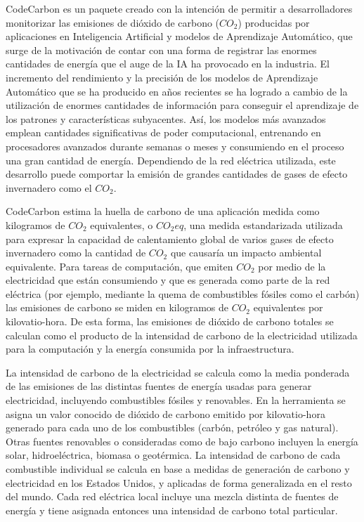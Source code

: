 CodeCarbon es un paquete creado con la intención de permitir a desarrolladores monitorizar las emisiones de dióxido de carbono ($CO_{2}$) producidas por aplicaciones en Inteligencia Artificial y modelos de Aprendizaje Automático, que surge de la motivación de contar con una forma de registrar las enormes cantidades de energía que el auge de la IA ha provocado en la industria. El incremento del rendimiento y la precisión de los modelos de Aprendizaje Automático que se ha producido en años recientes se ha logrado a cambio de la utilización de enormes cantidades de información para conseguir el aprendizaje de los patrones y características subyacentes. Así, los modelos más avanzados emplean cantidades significativas de poder computacional, entrenando en procesadores avanzados durante semanas o meses y consumiendo en el proceso una gran cantidad de energía. Dependiendo de la red eléctrica utilizada, este desarrollo puede comportar la emisión de grandes cantidades de gases de efecto invernadero como el $CO_{2}$.

CodeCarbon estima la huella de carbono de una aplicación medida como kilogramos de $CO_{2}$ equivalentes, o $CO_{2}eq$, una medida estandarizada utilizada para expresar la capacidad de calentamiento global de varios gases de efecto invernadero como la cantidad de $CO_{2}$ que causaría un impacto ambiental equivalente. Para tareas de computación, que emiten $CO_{2}$ por medio de la electricidad que están consumiendo y que es generada como parte de la red eléctrica (por ejemplo, mediante la quema de combustibles fósiles como el carbón) las emisiones de carbono se miden en kilogramos de $CO_{2}$ equivalentes por kilovatio-hora. De esta forma, las emisiones de dióxido de carbono totales se calculan como el producto de la intensidad de carbono de la electricidad utilizada para la computación y la energía consumida por la infraestructura.

La intensidad de carbono de la electricidad se calcula como la media ponderada de las emisiones de las distintas fuentes de energía usadas para generar electricidad, incluyendo combustibles fósiles y renovables. En la herramienta se asigna un valor conocido de dióxido de carbono emitido por kilovatio-hora generado para cada uno de los combustibles (carbón, petróleo y gas natural). Otras fuentes renovables o consideradas como de bajo carbono incluyen la energía solar, hidroeléctrica, biomasa o geotérmica. La intensidad de carbono de cada combustible individual se calcula en base a medidas de generación de carbono y electricidad en los Estados Unidos, y aplicadas de forma generalizada en el resto del mundo. Cada red eléctrica local incluye una mezcla distinta de fuentes de energía y tiene asignada entonces una intensidad de carbono total particular.

